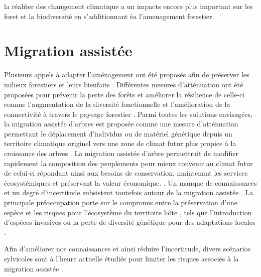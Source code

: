 la réaliter des changement climatique a un impacts encore plus important sur les foret et la biodiversité en s'additionnant èa l'amenagement forestier. \citep{Tremblay2018Harvestinginteracts,Ochs2022Responseterrestrial,Bouderbala2023Longtermeffect}




\section*{Migration assistée}
\label{sec:fam}

Plusieurs appels à adapter l'aménagement ont été proposés afin de préserver les milieux forestiers et leurs bienfaits \citep{Nagel2017Adaptivesilviculture,Messier2021sakeresilience}.
Différentes mesures d'atténuation ont été proposées pour prévenir la perte des forêts et améliorer la résilience de celle-ci comme l'augmentation de la diversité fonctionnelle et l'amélioration de la connectivité à travers le paysage forestier \citep{Messier2019functionalcomplex}.
Parmi toutes les solutions envisagées, la migration assistée d'arbres est proposée comme une mesure d'atténuation permettant le déplacement d'individus ou de matériel génétique depuis un territoire climatique originel vers une zone de climat futur plus propice à la croissance des arbres \citep{Vitt2010Assistedmigration,Dumroese2015Considerationsrestoring,Park2018Informationunderload,Park2023Provenancetrials}. 
La migration assistée d'arbre permettrait de modifier rapidement la composition des peuplements pour mieux convenir au climat futur de celui-ci \citep{Pedlar2011implementationassisted} 
répondant ainsi aux besoins de conservation, maintenant les services écosystémiques et préservant la valeur économique. \citep{Ste-Marie2011Assistedmigration,Winder2011Ecologicalimplications}.
Un manque de connaissances et un degré d'incertitude subsistent toutefois autour de la migration assistée \citep{Klenk2015assistedmigration,Park2018Informationunderload}. 
La principale préoccupation porte sur le compromis entre la préservation d'une espèce et les risques pour l'écosystème du territoire hôte \citep{Ricciardi2009Assistedcolonization}, 
tels que l'introduction d'espèces invasives ou la perte de diversité génétique pour des adaptations locales \citep{McLachlan2007frameworkdebate,Vitt2010Assistedmigration,Hewitt2011Takingstock,VanDaele2022Genomicanalyses}.

Afin d'améliorer nos connaissances et ainsi réduire l'incertitude, divers scénarios sylvicoles sont à l'heure actuelle étudiés pour limiter les risques associés à la migration assistée \citep{royoDesiredREgenerationAssisted2023}.




